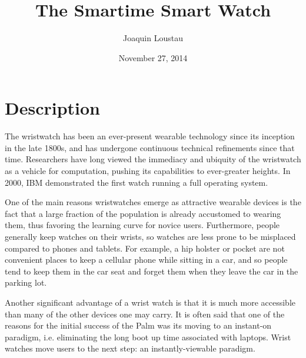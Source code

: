 \documentclass{article}
\title{The Smartime Smart Watch}
\author{Joaquin Loustau}
\date{November 27, 2014}
\begin{document}
\maketitle


\pagebreak
\tableofcontents

\pagebreak

%
%
\section{Description}
The wristwatch has been an ever-present wearable technology since its inception in the late 1800s, and has undergone continuous technical refinements since that time. Researchers have long viewed the immediacy and ubiquity of the wristwatch as a vehicle for computation, pushing its capabilities to ever-greater heights. In 2000, IBM demonstrated the first watch running a full operating system.\cite{amft2009backpacks}  

One of the main reasons wristwatches emerge as attractive wearable devices is the fact that a large fraction of the population is already accustomed to wearing them, thus favoring the learning curve for novice users. Furthermore, people generally keep watches on their wrists, so watches are less prone to be misplaced compared to phones and tablets. For example, a hip holster or pocket are not convenient places to keep a cellular phone while sitting in a car, and so people tend to keep them in the car seat and forget them when they leave the car in the parking lot. 

Another significant advantage of a wrist watch is that it is much more accessible than many of the other devices one may carry. It is often said that one of the reasons for the initial success of the Palm was its moving to an instant-on paradigm, i.e. eliminating the long boot up time associated with laptops. Wrist watches move users to the next step: an instantly-viewable paradigm.
\end{document}
